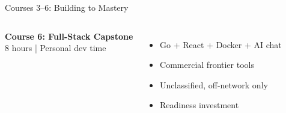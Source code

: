 \documentclass[aspectratio=169,11pt]{beamer}
\newcommand{\navy}[1]{\textbf{\color{navyblue}#1}}
\begin{document}
\begin{frame}[shrink=5]{Courses 3--6: Building to Mastery}
\begin{columns}[T]
\vspace{4pt}

\navy{Course 6: Full-Stack Capstone}\\
{\scriptsize 8 hours | Personal dev time}

\begin{itemize}\scriptsize
  \item Go + React + Docker + AI chat
  \item Commercial frontier tools
  \item Unclassified, off-network only
  \item Readiness investment
\end{itemize}

\end{columns}

\end{frame}
\end{document}

